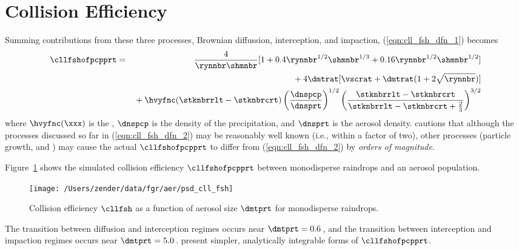 \documentclass[12pt,twoside]{book}
\begin{document}
\section[Collision Efficiency]{Collision Efficiency}\label{sxn:cll_fsh}
Summing contributions from these three processes, Brownian diffussion,
interception, and impaction, (\ref{eqn:cll_fsh_dfn_1}) becomes
\begin{eqnarray}
\cllfshofpcpprt & = & 
\frac{4}{\rynnbr \shmnbr } 
[ 1 + 0.4 \rynnbr^{1/2} \shmnbr^{1/3} + 0.16 \rynnbr^{1/2} \shmnbr^{1/2} ]
\nonumber \\ 
& & %
{} + 4 \dmtrat [ \vscrat +
\dmtrat ( 1 + 2 \sqrt{\rynnbr} ) ]
\nonumber \\
& & %
{} + \hvyfnc ( \stknbrrlt - \stknbrcrt )
\left( \frac{\dnspcp}{\dnsprt } \right)^{1/2}
\left( \frac{\stknbrrlt - \stknbrcrt }{
\stknbrrlt - \stknbrcrt + \frac{2}{3} } \right)^{3/2}
\label{eqn:cll_fsh_dfn_2}
\end{eqnarray}
where $\hvyfnc ( \xxx )$ is the , 
$\dnspcp$ is the density of the precipitation, and $\dnsprt$ is the
aerosol density.  
\cite{Sli82} cautions that although the processes discussed so far in
(\ref{eqn:cll_fsh_dfn_2}) may be reasonably well known (i.e., within a
factor of two), other processes (particle growth,
 and ) may cause the
actual $\cllfshofpcpprt$ to differ from (\ref{eqn:cll_fsh_dfn_2}) by
\textit{orders of magnitude}. 

Figure~\ref{fgr:cll_fsh} shows the simulated collision efficiency
$\cllfshofpcpprt$ between monodisperse raindrops
and an aerosol population. 
\begin{figure*}
\begin{center}
\texttt{[image: /Users/zender/data/fgr/aer/psd\_cll\_fsh]}\vfill
\end{center}
\caption[Collision Efficiency]{
Collision efficiency $\cllfsh$ as a function of aerosol size
$\dmtprt$ for monodisperse raindrops.
\label{fgr:cll_fsh}}
\end{figure*}
The transition between diffusion and interception regimes occurs near
$\dmtprt = 0.6$\,\um, and the transition between interception and
impaction regimes occurs near $\dmtprt = 5.0$\,\um.
\cite{DaH76} present simpler, analytically integrable forms of
$\cllfshofpcpprt$. 
\end{document}

